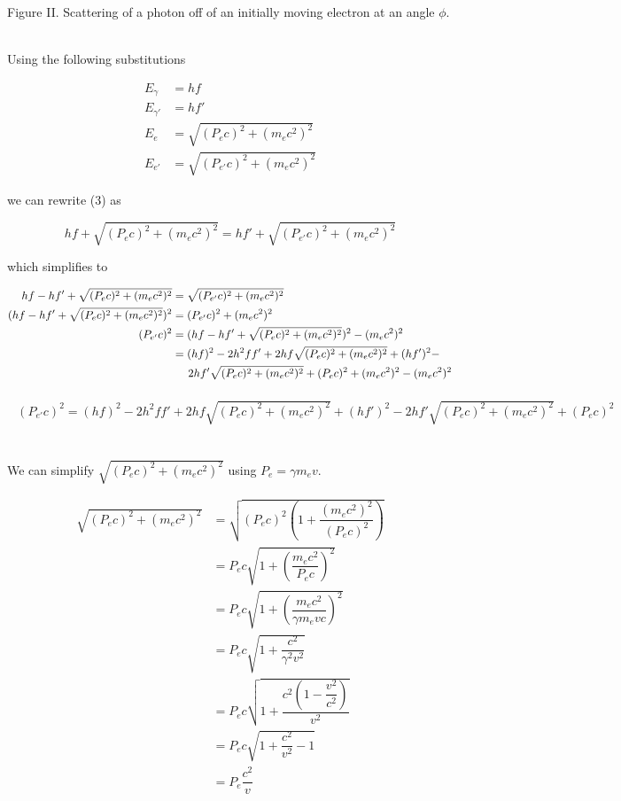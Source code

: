 \documentclass{article}
\begin{document}
\begin{center}
    Figure II. Scattering of a photon off of an initially moving electron at an angle $\phi$.
\end{center}

\noindent \\ Using the following substitutions

\begin{align*}
E_{\gamma} &= hf\\
E_{\gamma'} &= hf'\\
E_{e} &= \sqrt{(P_ec)^2 + (m_ec^2)^2}\\
E_{e'} &= \sqrt{(P_{e'}c)^2 + (m_ec^2)^2}
\end{align*}

\noindent we can rewrite (3) as

\begin{equation*}
hf + \sqrt{(P_ec)^2 + (m_ec^2)^2} = hf' + \sqrt{(P_{e'}c)^2 + (m_ec^2)^2}
\end{equation*}

\noindent which simplifies to

\begin{align*}
\begin{split}
hf - hf' + \sqrt{(P_ec)^2 + (m_ec^2)^2} &= \sqrt{(P_{e'}c)^2 + (m_ec^2)^2} \\
(hf - hf' + \sqrt{(P_ec)^2 + (m_ec^2)^2})^2 &= (P_{e'}c)^2 + (m_ec^2)^2 \\
(P_{e'}c)^2 &= (hf - hf' + \sqrt{(P_ec)^2 + (m_ec^2)^2})^2 - (m_ec^2)^2 \\
&= (hf)^2 - 2h^2ff' + 2hf\sqrt{(P_ec)^2 + (m_ec^2)^2} + (hf')^2 - \\
&\hspace{5mm} 2hf'\sqrt{(P_ec)^2 + (m_ec^2)^2} + (P_ec)^2 + (m_ec^2)^2 - (m_ec^2)^2 \\
\end{split}
\end{align*}

\begin{align}
\begin{split}
(P_{e'}c)^2= (hf)^2 - 2h^2ff' + 2hf\sqrt{(P_ec)^2 + (m_ec^2)^2} + (hf')^2 - 2hf'\sqrt{(P_ec)^2 + (m_ec^2)^2} + (P_ec)^2
\end{split}
\end{align} \

\noindent We can simplify $\sqrt{(P_ec)^2 + (m_ec^2)^2}$ using $P_e = \gamma m_ev$.


\begin{align*}
\sqrt{(P_ec)^2 + (m_ec^2)^2} &= \sqrt{(P_ec)^2\left(1 + \dfrac{(m_ec^2)^2}{(P_ec)^2}\right)}\\
&= P_ec \sqrt{1 + \left(\dfrac{m_ec^2}{P_ec}\right)^2} \\
&= P_ec \sqrt{1 + \left(\dfrac{m_ec^2}{\gamma m_evc}\right)^2} \\
&= P_ec \sqrt{1 + \dfrac{c^2}{\gamma^2 v^2}} \\
&= P_ec \sqrt{1 + \dfrac{c^2\left(1 - \dfrac{v^2}{c^2}\right)}{v^2}} \\
&= P_ec \sqrt{1 + \dfrac{c^2}{v^2} - 1} \\
&= P_e\dfrac{c^2}{v}
\end{align*}
\end{document}
